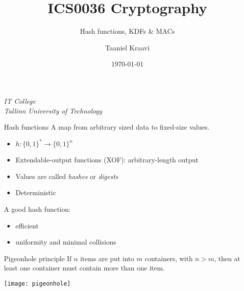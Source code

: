 \graphicspath{ {../../images/} }
\usetikzlibrary{external}

\usepackage{fancyvrb}

\usepackage[dvipsnames]{xcolor}

\setmonofont{cmuntt}

\title{ICS0036 Cryptography}
\subtitle{Hash functions, KDFs \& MACs}
\date{\today}
\author{Taaniel Kraavi}
\institute%
{%
  \textit{IT College}\\
  \textit{Tallinn University of Technology}
}


\begin{frame}
  \titlepage
\end{frame}

\begin{frame}{Hash functions}
  \pause
  A map from arbitrary sized data to fixed-size values.
  \begin{itemize}[<+(1)->]
    \item $h:\{0,1\}^* \to \{0,1\}^n$
    \item Extendable-output functions (XOF): arbitrary-length output
    \item Values are called \emph{hashes} or \emph{digests}
    \item Deterministic
  \end{itemize}

  \vspace*{1em}

  \pause
  A good hash function:
  \begin{itemize}[<+(1)->]
    \item efficient
    \item uniformity and minimal collisions
  \end{itemize}
\end{frame}

\begin{frame}{Pigeonhole principle}
  \pause
  If $n$ items are put into $m$ containers, with $n > m$, then at least one container must contain more than one item.

  \vspace*{1em}

  \pause
  \begin{center}
    \texttt{[image: pigeonhole]}
  \end{center}
\end{frame}

